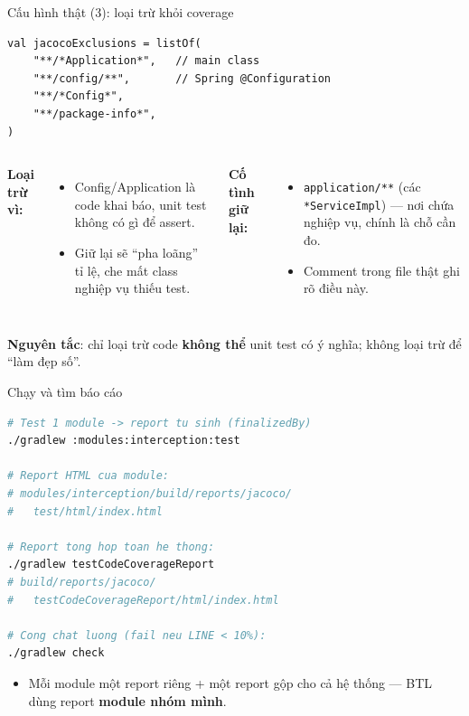 \documentclass[aspectratio=169,12pt]{beamer}
\begin{document}
\begin{frame}[fragile]{Cấu hình thật (3): loại trừ khỏi coverage}
\begin{lstlisting}[basicstyle=\ttfamily\scriptsize]
val jacocoExclusions = listOf(
    "**/*Application*",   // main class
    "**/config/**",       // Spring @Configuration
    "**/*Config*",
    "**/package-info*",
)
\end{lstlisting}

  \begin{columns}[T]
    \textbf{Loại trừ vì:}
    \begin{itemize}
      \item \small Config/Application là code khai báo,
            unit test không có gì để assert.
      \item \small Giữ lại sẽ ``pha loãng'' tỉ lệ, che mất
            class nghiệp vụ thiếu test.
    \end{itemize}

    \textbf{Cố tình giữ lại:}
    \begin{itemize}
      \item \small \texttt{application/**} (các \texttt{*ServiceImpl}) ---
            nơi chứa nghiệp vụ, chính là chỗ cần đo.
      \item \small Comment trong file thật ghi rõ điều này.
    \end{itemize}
  \end{columns}

  \vspace{0.2em}
  {\small \textbf{Nguyên tắc}: chỉ loại trừ code \textbf{không thể} unit test
  có ý nghĩa; không loại trừ để ``làm đẹp số''.}
\end{frame}

\begin{frame}[fragile]{Chạy và tìm báo cáo}
\begin{lstlisting}[language=bash,basicstyle=\ttfamily\footnotesize]
# Test 1 module -> report tu sinh (finalizedBy)
./gradlew :modules:interception:test

# Report HTML cua module:
# modules/interception/build/reports/jacoco/
#   test/html/index.html

# Report tong hop toan he thong:
./gradlew testCodeCoverageReport
# build/reports/jacoco/
#   testCodeCoverageReport/html/index.html

# Cong chat luong (fail neu LINE < 10%):
./gradlew check
\end{lstlisting}

  \begin{itemize}
    \item Mỗi module một report riêng + một report gộp cho cả hệ thống ---
          BTL dùng report \textbf{module nhóm mình}.
  \end{itemize}
\end{frame}
\end{document}
